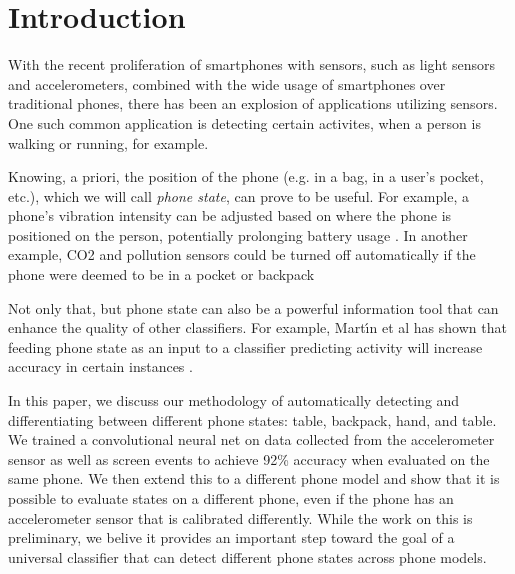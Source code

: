 \section{Introduction}
With the recent proliferation of smartphones with sensors, such as light sensors and accelerometers,
 combined with the wide usage of smartphones over traditional phones, 
 there has been an explosion of applications utilizing sensors.
One such common application is detecting certain activites, when a person is walking or running, for example.

Knowing, a priori, the position of the phone (e.g. in a bag, in a user's pocket, etc.), 
 which we will call \textit{phone state}, can prove to be useful.
For example, a phone's vibration intensity can be adjusted based on where the phone is positioned on the person, potentially prolonging battery usage \cite{Fujinami2013}.
In another example, CO2 and pollution sensors could be turned off automatically if the phone were deemed to be in a pocket or backpack \cite{Miluzzo2010} 

Not only that, but phone state can also be a powerful information tool that can enhance the quality of other classifiers.
For example, Mart\'{\i}n et al has shown that feeding phone state as an input to a classifier predicting activity will increase accuracy in certain instances \cite{Martin2013}.  


In this paper, we discuss our methodology of automatically detecting and differentiating between different phone states: table, backpack, hand, and table. 
We trained a convolutional neural net on data collected from the accelerometer sensor 
 as well as screen events to achieve 92\% accuracy when evaluated on the same phone.
We then extend this to a different phone model and show that it is possible to evaluate states on a 
 different phone, even if the phone has an accelerometer sensor that is calibrated differently.
While the work on this is preliminary, we belive it provides an important step toward the goal of a 
universal classifier that can detect different phone states across phone models. 

